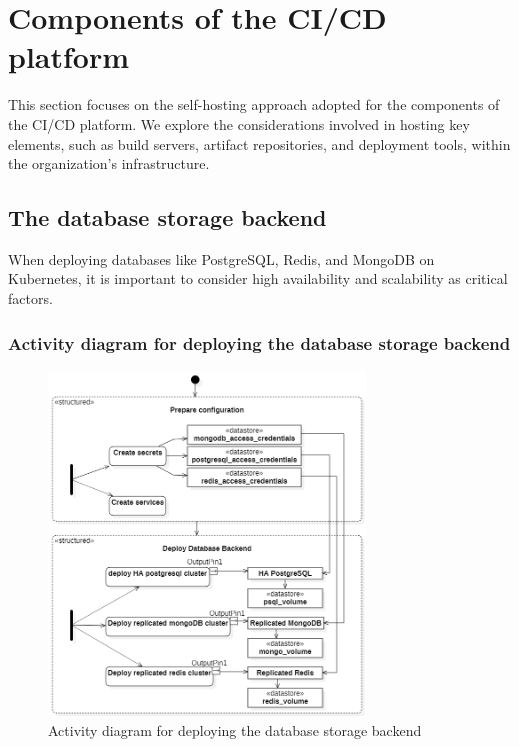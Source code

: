 \section{Components of the CI/CD platform }

\hspace{7mm}This section focuses on the self-hosting approach adopted for the components of the CI/CD platform. We explore the considerations involved in hosting key elements, such as build servers, artifact repositories, and deployment tools, within the organization's infrastructure.

\subsection{The database storage backend }

\hspace{7mm}When deploying databases like PostgreSQL, Redis, and MongoDB on Kubernetes, it is important to consider high availability and scalability as critical factors. 

\subsubsection{Activity diagram for deploying the database storage backend }
\begin{figure}[H]\centering
\includegraphics[width=0.75\textwidth,angle=00]{assets/f35.png}
\caption{Activity diagram for deploying the database storage backend}
\label{fig:Activity diagram for deploying the database storage backend}
\end{figure}

